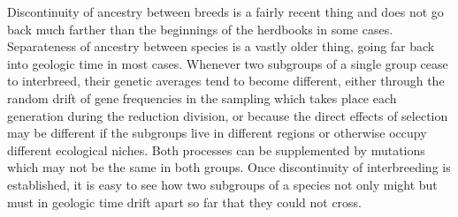 Discontinuity of ancestry between breeds is a fairly recent thing and
does not go back much farther than the beginnings of the herdbooks in
some cases. Separateness of ancestry between species is a vastly older
thing, going far back into geologic time in most cases. Whenever two
subgroups of a single group cease to interbreed, their genetic averages
tend to become different, either through the random drift of gene frequencies
in the sampling which takes place each generation during the
reduction division, or because the direct effects of selection may be different
if the subgroups live in different regions or otherwise occupy
different ecological niches. Both processes can be supplemented by
mutations which may not be the same in both groups. Once discontinuity
of interbreeding is established, it is easy to see how two subgroups of
a species not only might but must in geologic time drift apart so far that
they could not cross.

